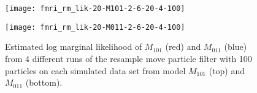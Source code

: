 \documentclass{article}
\begin{document}
\begin{figure}[ht]
\begin{minipage}{0.75\linewidth}
\texttt{[image: fmri\_rm\_lik-20-M101-2-6-20-4-100]}
\end{minipage}
\begin{minipage}{0.75\linewidth}
\texttt{[image: fmri\_rm\_lik-20-M011-2-6-20-4-100]}
\end{minipage}
\caption{Estimated log marginal likelihood of $M_{101}$ (red) and $M_{011}$ (blue) from 4 different runs of the resample move particle filter with 100 particles on each simulated data set from model $M_{101}$ (top) and $M_{011}$ (bottom).} \label{fig:fmri-lik}
\end{figure}

\clearpage



\end{document}
